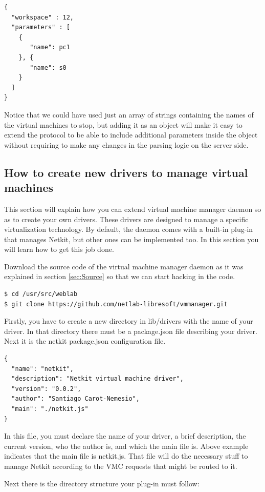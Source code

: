 \documentclass{article}
\begin{document}
\begin{verbatim}
{
  "workspace" : 12,
  "parameters" : [
    {
       "name": pc1
    }, {
       "name": s0
    }
  ]
}
\end{verbatim}

Notice that we could have used just an array of strings containing the names of the virtual machines to stop, but adding it as an object will make it easy to extend the protocol to be able to include additional parameters inside the object without requiring to make any changes in the parsing logic on the server side.

\subsection{How to create new drivers to manage virtual machines}
This section will explain how you can extend virtual machine manager daemon so as to create your own drivers. These drivers are designed to manage a specific virtualization technology. By default, the daemon comes with a built-in plug-in that manages Netkit, but other ones can be implemented too. In this section you will learn how to get this job done.

Download the source code of the virtual machine manager daemon as it was explained in section \ref{sec:Source} so that we can start hacking in the code.

\begin{verbatim}
$ cd /usr/src/weblab
$ git clone https://github.com/netlab-libresoft/vmmanager.git
\end{verbatim}

Firstly, you have to create a new directory in lib/drivers with the name of your driver. In that directory there must be a package.json file describing your driver. Next it is the netkit package.json configuration file.

\begin{verbatim}
{
  "name": "netkit",
  "description": "Netkit virtual machine driver",
  "version": "0.0.2",
  "author": "Santiago Carot-Nemesio",
  "main": "./netkit.js"
}
\end{verbatim}

In this file, you must declare the name of your driver, a brief description, the current version, who the author is, and which the main file is. Above example indicates that the main file is netkit.js. That file will do the necessary stuff to manage Netkit according to the VMC requests that might be routed to it.

Next there is the directory structure your plug-in must follow:
\end{document}
